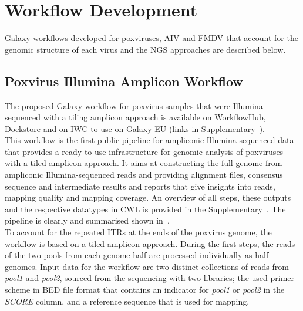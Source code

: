 \section{Workflow Development}
Galaxy workflows developed for poxviruses, \ac{AIV} and \ac{FMDV} that account for the genomic structure of each virus and the NGS approaches are described below.

\subsection{Poxvirus Illumina Amplicon Workflow}\label{sec:pox-wf}
The proposed Galaxy workflow for poxvirus samples that were Illumina-sequenced with a tiling amplicon approach is available on WorkflowHub, Dockstore and on \ac{IWC} to use on Galaxy EU (links in Supplementary~). \\
This workflow is the first public pipeline for ampliconic Illumina-sequenced data that provides a ready-to-use infrastructure for genomic analysis of poxviruses with a tiled amplicon approach. It aims at constructing the full genome from ampliconic Illumina-sequenced reads and providing alignment files, consensus sequence and intermediate results and reports that give insights into reads, mapping quality and mapping coverage. An overview of all steps, these outputs and the respective datatypes in \ac{CWL}  is provided in the Supplementary~. The pipeline is clearly and summarised shown in~. \\ 
To account for the repeated \acp{ITR} at the ends of the poxvirus genome, the workflow is based on a tiled amplicon approach. During the first steps, the reads of the two pools from each genome half are processed individually as half genomes. Input data for the workflow are two distinct collections of reads from \textit{pool1} and \textit{pool2}, sourced from the sequencing with two libraries; the used primer scheme in \ac{BED} file format that contains an indicator for \textit{pool1} or \textit{pool2} in the \textit{SCORE} column, and a reference sequence that is used for mapping. 

